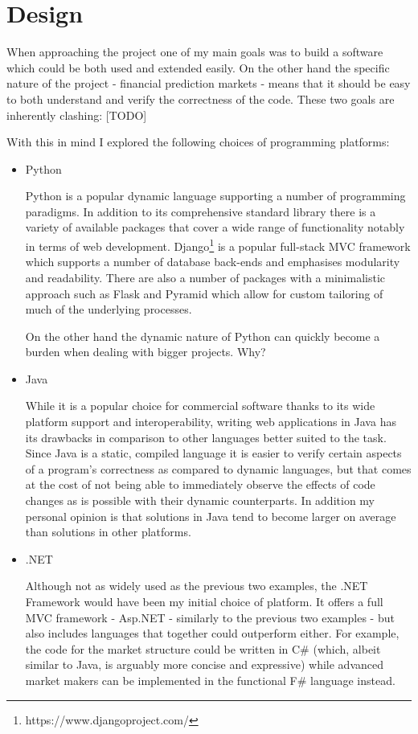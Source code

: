 \documentclass[bsc,frontabs,twoside,singlespacing,parskip,deptreport]{infthesis}     %
\begin{document}
\section{Design}

    When approaching the project one of my main goals was to build a software which could be both used and extended easily. On the other hand the specific nature of the project - financial prediction markets - means that it should be easy to both understand and verify the correctness of the code. These two goals are inherently clashing: [TODO]
    
With this in mind I explored the following choices of programming platforms:

\begin{itemize}
\item Python

Python is a popular dynamic language supporting a number of programming paradigms. In addition to its comprehensive standard library there is a variety of available packages that cover a wide range of functionality notably in terms of web development. Django\footnote{https://www.djangoproject.com/} is a popular full-stack MVC framework which supports a number of database back-ends and emphasises modularity and readability. There are also a number of packages with a minimalistic approach such as Flask and Pyramid which allow for custom tailoring of much of the underlying processes.

On the other hand the dynamic nature of Python can quickly become a burden when dealing with bigger projects. Why?

\item Java

While it is a popular choice for commercial software thanks to its wide platform support and interoperability, writing web applications in Java has its drawbacks in comparison to other languages better suited to the task. Since Java is a static, compiled language it is easier to verify certain aspects of a program's correctness as compared to dynamic languages, but that comes at the cost of not being able to immediately observe the effects of code changes as is possible with their dynamic counterparts. In addition my personal opinion is that solutions in Java tend to become larger on average than solutions in other platforms.

\item .NET

    Although not as widely used as the previous two examples, the .NET Framework would have been my initial choice of platform. It offers a full MVC framework - Asp.NET -  similarly to the previous two examples - but also includes languages that together could outperform either. For example, the code for the market structure could be written in C\# (which, albeit similar to Java, is arguably more concise and expressive) while advanced market makers can be implemented in the functional F\# language instead.


\end{itemize}
\end{document}
